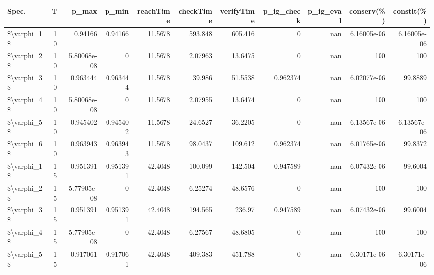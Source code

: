\begin{tabular}{lrrrrrrrrrr}
\hline
 Spec.       &   T &       p\_max &    p\_min &   reachTime &      checkTime &   verifyTime &   p\_ig\_check &   p\_ig\_eval &    conserv(\%) &    constit(\%) \\
\hline
 \$\textbackslash{}varphi\_1\$ &  10 & 0.94166     & 0.94166  &     11.5678 &  593.848       &     605.416  &     0        &         nan &   6.16005e-06 &   6.16005e-06 \\
 \$\textbackslash{}varphi\_2\$ &  10 & 5.80068e-08 & 0        &     11.5678 &    2.07963     &      13.6475 &     0        &         nan & 100           & 100           \\
 \$\textbackslash{}varphi\_3\$ &  10 & 0.963444    & 0.963444 &     11.5678 &   39.986       &      51.5538 &     0.962374 &         nan &   6.02077e-06 &  99.8889      \\
 \$\textbackslash{}varphi\_4\$ &  10 & 5.80068e-08 & 0        &     11.5678 &    2.07955     &      13.6474 &     0        &         nan & 100           & 100           \\
 \$\textbackslash{}varphi\_5\$ &  10 & 0.945402    & 0.945402 &     11.5678 &   24.6527      &      36.2205 &     0        &         nan &   6.13567e-06 &   6.13567e-06 \\
 \$\textbackslash{}varphi\_6\$ &  10 & 0.963943    & 0.963943 &     11.5678 &   98.0437      &     109.612  &     0.962374 &         nan &   6.01765e-06 &  99.8372      \\
 \$\textbackslash{}varphi\_1\$ &  15 & 0.951391    & 0.951391 &     42.4048 &  100.099       &     142.504  &     0.947589 &         nan &   6.07432e-06 &  99.6004      \\
 \$\textbackslash{}varphi\_2\$ &  15 & 5.77905e-08 & 0        &     42.4048 &    6.25274     &      48.6576 &     0        &         nan & 100           & 100           \\
 \$\textbackslash{}varphi\_3\$ &  15 & 0.951391    & 0.951391 &     42.4048 &  194.565       &     236.97   &     0.947589 &         nan &   6.07432e-06 &  99.6004      \\
 \$\textbackslash{}varphi\_4\$ &  15 & 5.77905e-08 & 0        &     42.4048 &    6.27567     &      48.6805 &     0        &         nan & 100           & 100           \\
 \$\textbackslash{}varphi\_5\$ &  15 & 0.917061    & 0.917061 &     42.4048 &  409.383       &     451.788  &     0        &         nan &   6.30171e-06 &   6.30171e-06 \\

\end{tabular}
